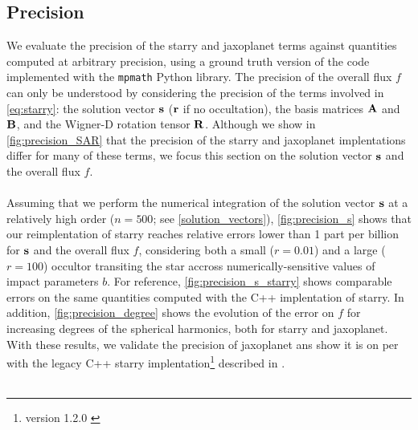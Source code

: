 \documentclass[modern]{aastex631}
\begin{document}
\subsection{Precision}
We evaluate the precision of the \textsf{starry} and \textsf{jaxoplanet} terms against quantities computed at arbitrary precision, using a ground truth version of the code implemented with the \texttt{mpmath} Python library. The precision of the overall flux $f$ can only be understood by considering the precision of the terms involved in \autoref{eq:starry}: the solution vector ${\mathbf{s}}$ (${\mathbf{r}}$ if no occultation), the basis matrices ${\mathbf{A}}$ and ${\mathbf{B}}$, and the Wigner-D rotation tensor ${\mathbf{R}}$. Although we show in \autoref{fig:precision_SAR} that the precision of the \textsf{starry} and \textsf{jaxoplanet} implentations differ for many of these terms, we focus this section on the solution vector ${\mathbf{s}}$ and the overall flux $f$.\\\\
Assuming that we perform the numerical integration of the solution vector ${\mathbf{s}}$ at a relatively high order ($n=500$; see \autoref{solution_vectors}), \autoref{fig:precision_s} shows that our reimplentation of \textsf{starry} reaches relative errors lower than 1 part per billion for ${\mathbf{s}}$ and the overall flux $f$, considering both a small ($r=0.01$) and a large ($r=100$) occultor transiting the star accross numerically-sensitive values of impact parameters $b$. For reference, \autoref{fig:precision_s_starry} shows comparable errors on the same quantities computed with the C++ implentation of \textsf{starry}. In addition, \autoref{fig:precision_degree} shows the evolution of the error on $f$ for increasing degrees of the spherical harmonics, both for \textsf{starry} and \textsf{jaxoplanet}. With these results, we validate the precision of \textsf{jaxoplanet} ans show it is on per with the legacy C++ \textsf{starry} implentation\footnote{version 1.2.0 \citep{starry_120}} described in \cite{starry}.\\\\
\end{document}
